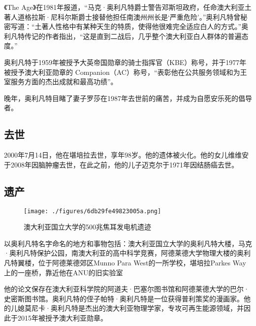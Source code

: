 《The Age》在1981年报道，“马克·奥利凡特爵士警告邓斯坦政府，任命澳大利亚土著人道格拉斯·尼科尔斯爵士接替他担任南澳州州长是‘严重危险’。”奥利凡特曾秘密写道：“土著人性格中有某种天生的特质，使得他很难完全适应白人的方式。”奥利凡特传记的作者指出，“这是直到二战后，几乎整个澳大利亚白人群体的普遍态度。”

奥利凡特于1959年被授予大英帝国勋章的骑士指挥官（KBE）称号，并于1977年被授予澳大利亚勋章的 Companion（AC）称号，“表彰他在公共服务领域和为王室服务方面的杰出成就和最高功绩”。

晚年，奥利凡特目睹了妻子罗莎在1987年去世前的痛苦，并成为自愿安乐死的倡导者。
\subsection{去世}
2000年7月14日，他在堪培拉去世，享年98岁。他的遗体被火化。他的女儿维维安于2008年因脑肿瘤去世，在此之前，他的儿子迈克尔于1971年因结肠癌去世。
\subsection{遗产}
\begin{figure}[ht]
\centering
\texttt{[image: ./figures/6db29fe49823005a.png]}
\caption{澳大利亚国立大学的500兆焦耳发电机遗迹} \label{fig_MKalft_10}
\end{figure}
以奥利凡特名字命名的地方和事物包括：澳大利亚国立大学的奥利凡特大楼，马克·奥利凡特保护公园，南澳大利亚的高中科学竞赛，阿德莱德大学物理大楼的奥利凡特翼楼，位于阿德莱德郊区Munno Para West的一所学校，堪培拉Parkes Way上的一座桥，靠近他在ANU的旧实验室

他的论文保存在澳大利亚科学院的阿道夫·巴塞尔图书馆和阿德莱德大学的巴尔·史密斯图书馆。奥利凡特的侄子帕特·奥利凡特是一位获得普利策奖的漫画家。他的儿媳莫尼卡·奥利凡特是杰出的澳大利亚物理学家，专攻可再生能源领域，并因此于2015年被授予澳大利亚勋章。
